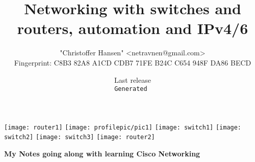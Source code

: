 
\title{Networking with switches and routers, automation and IPv4/6}
\def\thesubject{My Notes going along with learning Cisco Networking}

\author{"Christoffer Hansen" <netravnen@gmail.com>\\
    Fingerprint: C8B3 82A8 A1CD CDB7 71FE  B24C C654 948F DA86 BECD}

\date{{\footnotesize Last release \theversion\\%
    \texttt{\color{Gray}Generated \utccurrenttime}}}

\begin{titlepage}
    \centering
    \texttt{[image: router1]}
    \texttt{[image: profilepic/pic1]}
    \texttt{[image: switch1]}
    \texttt{[image: switch2]}
    \texttt{[image: switch3]}
    \texttt{[image: router2]}\par\vspace{1cm}
    {\scshape\Large \thetitle\par}
    \vspace{1.5cm}
    {\huge\bfseries \thesubject\par}
    \vspace{2cm}
    {\Large\itshape \theauthor\par}
    
    \vfill
    
    {\large \thedate\par}
\end{titlepage}
